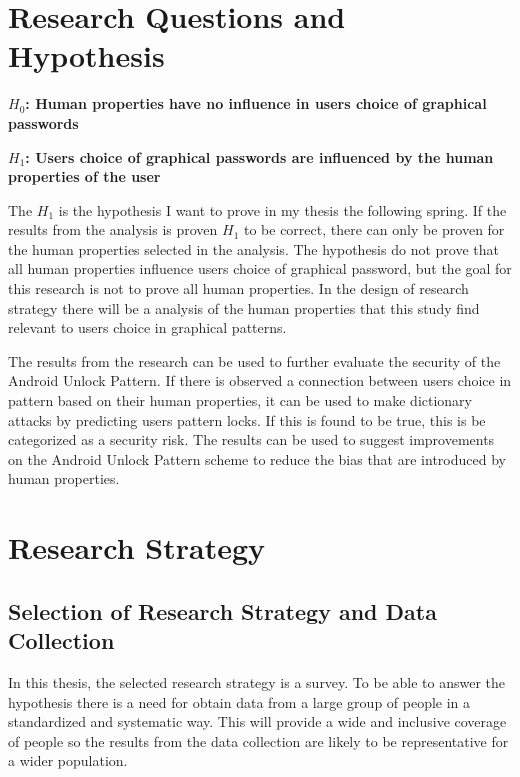 \section{Research Questions and Hypothesis}
    
  {\bf $H_{0}$: Human properties have no influence in users choice of graphical passwords} 

  {\bf $H_{1}$: Users choice of graphical passwords are influenced by the human properties of the user}

  The $H_{1}$ is the hypothesis I want to prove in my thesis the following spring. If the results from the analysis is proven $H_{1}$ to be correct, there can only be proven for the human properties selected in the analysis. The hypothesis do not prove that all human properties influence users choice of graphical password, but the goal for this research is not to prove all human properties. In the design of research strategy there will be a analysis of the human properties that this study find relevant to users choice in graphical patterns.

  The results from the research can be used to further evaluate the security of the Android Unlock Pattern. If there is observed a connection between users choice in pattern based on their human properties, it can be used to make dictionary attacks by predicting users pattern locks. If this is found to be true, this is be categorized as a security risk. The results can be used to suggest improvements on the Android Unlock Pattern scheme to reduce the bias that are introduced by human properties.

\section{Research Strategy}

  \subsection{Selection of Research Strategy and Data Collection}

    In this thesis, the selected research strategy is a survey. To be able to answer the hypothesis there is a need for obtain data from a large group of people in a standardized and systematic way. This will provide a wide and inclusive coverage of people so the results from the data collection are likely to be representative for a wider population. 

